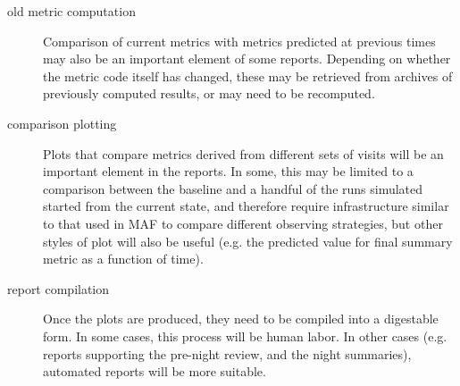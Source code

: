 \begin{description}
\item[{old metric computation}] Comparison of current metrics with metrics predicted at previous times may also be an important element of some reports. Depending on whether the metric code itself has changed, these may be retrieved from archives of previously computed results, or may need to be recomputed.
\item[{comparison plotting}] Plots that compare metrics derived from different sets of visits will be an important element in the reports. In some, this may be limited to a comparison between the baseline and a handful of the runs simulated started from the current state, and therefore require infrastructure similar to that used in MAF to compare different observing strategies, but other styles of plot will also be useful (e.g. the predicted value for final summary metric as a function of time).
\item[{report compilation}] Once the plots are produced, they need to be compiled into a digestable form. In some cases, this process will be human labor. In other cases (e.g. reports supporting the pre-night review, and the night summaries), automated reports will be more suitable.
\end{description}

